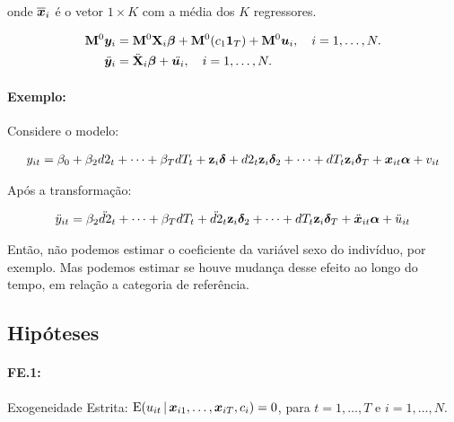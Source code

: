 \documentclass[11pt, oneside, a4paper, article]{article}
\numberwithin{equation}{section}
\begin{document}
\noindent
onde $\overline{\boldsymbol{x}}_{i}$ é o vetor $1 \times K$ com a média dos $K$ regressores.

\vspace{-1 em}
\begin{align}
\notag
\mathbf{M}^{0} \boldsymbol{y}_{i} &= \mathbf{M}^{0} \mathbf{X}_{i} \boldsymbol{\beta} + \mathbf{M}^{0} ( c_{1} \boldsymbol{1}_{T} ) + \mathbf{M}^{0} \boldsymbol{u}_{i},
\quad i = 1, \dots, N.
\\
\label{fe:mod:ddot:vec}
\ddot{\boldsymbol{y}}_{i} &= \ddot{\mathbf{X}}_{i} \boldsymbol{\beta} + \ddot{\boldsymbol{u}_{i}},
\quad i = 1, \dots, N.
\end{align}

\paragraph{Exemplo:} \citep[p.266]{wool-2010} Considere o modelo:

\vspace{-1.5 em}
\begin{align*}
y_{it} =
\beta_{0} + \beta_{2} d2_{t} + \dots + \beta_{T} dT_{t}
+
\mathbf{z}_{i} \boldsymbol{\delta} + d2_{t} \mathbf{z}_{i} \boldsymbol{\delta}_2  + \dots + dT_{t} \mathbf{z}_{i} \boldsymbol{\delta}_{T} + 
\boldsymbol{x}_{it} \boldsymbol{\alpha} + v_{it}
\end{align*}

Após a transformação:

\vspace{-1.5 em}
\begin{align*}
\ddot{y}_{it} =
\beta_{2} \ddot{d2}_{t} + \dots + \beta_{T} dT_{t}
+
\ddot{d2}_{t} \mathbf{z}_{i} \boldsymbol{\delta}_2  + \dots + dT_{t} \mathbf{z}_{i} \boldsymbol{\delta}_{T} + 
\ddot{\boldsymbol{x}}_{it} \boldsymbol{\alpha} + \ddot{u}_{it}
\end{align*}

Então, não podemos estimar o coeficiente da variável sexo do indivíduo, por exemplo.
Mas podemos estimar se houve mudança desse efeito ao longo do tempo, em relação a categoria de referência.

\subsection{Hipóteses}

\paragraph{FE.1:} Exogeneidade Estrita:
$\text{E}( u _{it} \, | \, \boldsymbol{x}_{i1}, \dots, \boldsymbol{x}_{iT}, c_{i}) = 0$, para $t=1, \dots, T$ e $i = 1, \dots, N$.
\end{document}

